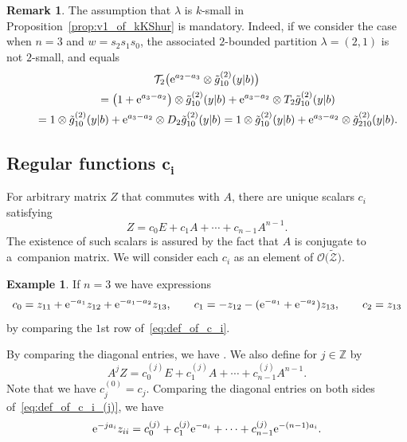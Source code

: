 \documentclass[10pt,a4paper]{amsart}
\numberwithin{equation}{section}
\newcommand{\Z}{\mathbb{Z}}
\theoremstyle{definition}
\newtheorem{Example}[Theorem]{Example}
\newtheorem{Remark}[Theorem]{Remark}
\begin{document}
\begin{Remark}
The assumption that $\lambda$ is $k$-small in Proposition~\ref{prop:v1_of_kKShur} is mandatory.
Indeed, if we consider the case when $n=3$ and $w=s_2s_1s_0$, the associated $2$-bounded partition $\lambda=(2,1)$ is not $2$-small, and
 equals
\begin{gather*}
\mathcal{T}_2\bigl({\rm e}^{a_2-a_3}\otimes \tilde{g}^{(2)}_{10}(y|b)\bigr)\\
\qquad
=\bigl(1+{\rm e}^{a_3-a_2}\bigr)\otimes \tilde{g}^{(2)}_{10}(y|b)+{\rm e}^{a_3-a_2}\otimes T_2\tilde{g}^{(2)}_{10}(y|b) \\
\qquad=1\otimes \tilde{g}^{(2)}_{10}(y|b)+{\rm e}^{a_3-a_2}\otimes D_2\tilde{g}^{(2)}_{10}(y|b)
=1\otimes \tilde{g}^{(2)}_{10}(y|b)+{\rm e}^{a_3-a_2}\otimes \tilde{g}^{(2)}_{210}(y|b).
\end{gather*}
\end{Remark}







\subsection[Regular functions c\_i]{Regular functions $\boldsymbol{c_i}$}\label{sec:ci}




For arbitrary matrix $Z$ that commutes with $A$, there are unique scalars $c_i$ satisfying
\begin{equation}\label{eq:def_of_c_i}
Z=c_0E+c_1A+\cdots+c_{n-1}A^{n-1}.
\end{equation} The existence of such
scalars is assured by the fact that $A$ is conjugate to a~companion matrix.
We will consider each $c_i$ as an element of $\mathscr{O}\bigl(\tilde{\mathscr{Z}}\bigr)$.

\begin{Example} If
$n=3$ we have expressions
\[
c_0=z_{11}+{\rm e}^{-a_1}z_{12}+{\rm e}^{-a_1-a_2}z_{13},\qquad
c_1=-z_{12}-({\rm e}^{-a_1}+{\rm e}^{-a_2})z_{13},\qquad
c_2=z_{13}
\]
by comparing the $1$st row of~\eqref{eq:def_of_c_i}.
\end{Example}




By comparing the diagonal
entries, we have
.
We also define 
for $j\in \Z$ by
\begin{equation}\label{eq:def_of_c_i_(j)}
A^jZ=c_0^{(j)}E+c_1^{(j)}A+\cdots+c_{n-1}^{(j)}A^{n-1}.
\end{equation}
Note that we have $c_j^{(0)}=c_j$.
Comparing the diagonal entries on both sides of~\eqref{eq:def_of_c_i_(j)}, we have
\begin{equation}
{\rm e}^{-ja_i}z_{ii}=c_0^{(j)}+c_1^{(j)} {\rm e}^{-a_i}+
\cdots+c_{n-1}^{(j)}{\rm e}^{-(n-1)a_i}.\label{eq:zii_c_2}
\end{equation}
\end{document}

